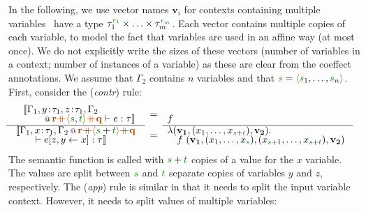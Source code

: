 In the following, we use vector names $\mathbf{v}_i$ for contexts containing multiple variables
\ie~have a type $\tau_1^{\cclrd{r_1}}\times\ldots\times\tau_m^{\cclrd{r_m}}$. Each vector contains
multiple copies of each variable, to model the fact that variables are used in an affine way (at most
once). We do not explicitly write the sizes of these vectors (number of variables in a context; number
of instances of a variable) as these are clear from the coeffect annotations. We assume that $\Gamma_2$
contains $n$ variables and that $\aclrd{s}=\alift{\cclrd{s}_1, \ldots, \cclrd{s}_n}$. First, consider
the (\emph{contr}) rule:
%
\begin{equation*}
\hspace{-1em}
\begin{array}{l}
\mdeff
  {\begin{array}{l}\sem{\coctx{\Gamma_1,y\!:\!\tau_1,z\!:\!\tau_1,\Gamma_2\\[-0.25em]\qquad}
      {\aclrd{\textbf{r}} \atimes \alift{\cclrd{s},\cclrd{t}} \atimes \aclrd{\textbf{q}}} \vdash e : \tau}\end{array}}
  {\begin{array}{l}\sem{\coctx{\Gamma_1,x\!:\!\tau_1,\Gamma_2}{\aclrd{\textbf{r}}
          \atimes \alift{\cclrd{s} + \cclrd{t}} \atimes \aclrd{\textbf{q}}} \\[-0.25em] \qquad\vdash \subst{e}{z,y}{x} : \tau}\end{array}}
  {\begin{array}{l}~\\[-0.25em]\hspace{-0.5em}f\end{array}}
  {\hspace{-0.5em}\begin{array}{l}\lambda(\mathbf{v_1}, (x_1, \ldots, x_{\cclrd{s}+\cclrd{t}}), \mathbf{v_2}) .\\[-0.25em]
  \quad f~(\mathbf{v_1}, (x_1, \ldots, x_{\cclrd{s}}), (x_{\cclrd{s}+1}, \ldots, x_{\cclrd{s}+\cclrd{t}} ), \mathbf{v_2})\end{array}\hspace{-0.5em}~}
\end{array}
\end{equation*}
%
The semantic function is called with $\cclrd{s}+\cclrd{t}$ copies of
a value for the $x$ variable. The values are split between $\cclrd{s}$ and $\cclrd{t}$ separate
copies of variables $y$ and $z$, respectively. The (\emph{app}) rule is similar in that it needs to
split the input variable context. However, it needs to split values of multiple variables:
